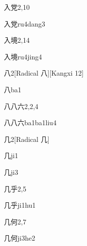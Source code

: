 \begin{entry}{入党}{2,10}
  \begin{phonetics}{入党}{ru4dang3}
  \end{phonetics}
\end{entry}

\begin{entry}{入境}{2,14}
  \begin{phonetics}{入境}{ru4jing4}
  \end{phonetics}
\end{entry}

\begin{entry}{八}{2}[Radical 八][Kangxi 12]
  \begin{phonetics}{八}{ba1}
  \end{phonetics}
\end{entry}

\begin{entry}{八八六}{2,2,4}
  \begin{phonetics}{八八六}{ba1ba1liu4}
  \end{phonetics}
\end{entry}

\begin{entry}{几}{2}[Radical 几]
  \begin{phonetics}{几}{ji1}
  \end{phonetics}
  \begin{phonetics}{几}{ji3}
  \end{phonetics}
\end{entry}

\begin{entry}{几乎}{2,5}
  \begin{phonetics}{几乎}{ji1hu1}
  \end{phonetics}
\end{entry}

\begin{entry}{几何}{2,7}
  \begin{phonetics}{几何}{ji3he2}
  \end{phonetics}
\end{entry}

